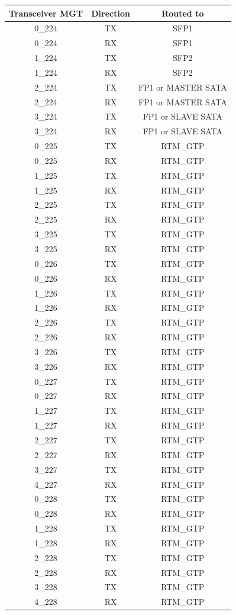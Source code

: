 \begin{longtable}{|c|c|c|}\hline
Transceiver MGT & Direction & Routed to \\ \hline
0\_224 & TX & SFP1 \\ \hline
0\_224 & RX & SFP1 \\ \hline
1\_224 & TX & SFP2 \\ \hline
1\_224 & RX & SFP2 \\ \hline
2\_224 & TX & FP1 or MASTER SATA \\ \hline
2\_224 & RX & FP1 or MASTER SATA\\ \hline
3\_224 & TX & FP1 or SLAVE SATA\\ \hline
3\_224 & RX & FP1 or SLAVE SATA\\ \hline
0\_225 & TX & RTM\_GTP \\ \hline
0\_225 & RX & RTM\_GTP \\ \hline
1\_225 & TX & RTM\_GTP \\ \hline
1\_225 & RX & RTM\_GTP \\ \hline
2\_225 & TX & RTM\_GTP \\ \hline
2\_225 & RX & RTM\_GTP \\ \hline
3\_225 & TX & RTM\_GTP \\ \hline
3\_225 & RX & RTM\_GTP \\ \hline
0\_226 & TX & RTM\_GTP \\ \hline
0\_226 & RX & RTM\_GTP \\ \hline
1\_226 & TX & RTM\_GTP \\ \hline
1\_226 & RX & RTM\_GTP \\ \hline
2\_226 & TX & RTM\_GTP \\ \hline
2\_226 & RX & RTM\_GTP \\ \hline
3\_226 & TX & RTM\_GTP \\ \hline
3\_226 & RX & RTM\_GTP \\ \hline
0\_227 & TX & RTM\_GTP \\ \hline
0\_227 & RX & RTM\_GTP \\ \hline
1\_227 & TX & RTM\_GTP \\ \hline
1\_227 & RX & RTM\_GTP \\ \hline
2\_227 & TX & RTM\_GTP \\ \hline
2\_227 & RX & RTM\_GTP \\ \hline
3\_227 & TX & RTM\_GTP \\ \hline
4\_227 & RX & RTM\_GTP \\ \hline
0\_228 & TX & RTM\_GTP \\ \hline
0\_228 & RX & RTM\_GTP \\ \hline
1\_228 & TX & RTM\_GTP \\ \hline
1\_228 & RX & RTM\_GTP \\ \hline
2\_228 & TX & RTM\_GTP \\ \hline
2\_228 & RX & RTM\_GTP \\ \hline
3\_228 & TX & RTM\_GTP \\ \hline
4\_228 & RX & RTM\_GTP \\ \hline
\end{longtable}	
	
